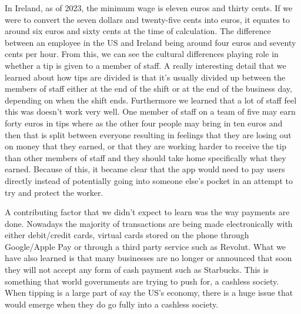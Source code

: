 In Ireland, as of 2023, the minimum wage is eleven euros and thirty cents\cite{MinWageIreland}. If we were to convert the seven dollars and twenty-five cents into euros, it equates to around six euros and sixty cents at the time of calculation. The difference between an employee in the US and Ireland being around four euros and seventy cents per hour. From this, we can see the cultural differences playing role in whether a tip is given to a member of staff. A really interesting detail that we learned about how tips are divided is that it's usually divided up between the members of staff either at the end of the shift or at the end of the business day, depending on when the shift ends. Furthermore we learned that a lot of staff feel this was doesn't work very well. One member of staff on a team of five may earn forty euros in tips where as the other four people may bring in ten euros and then that is split between everyone resulting in feelings that they are losing out on money that they earned, or that they are working harder to receive the tip than other members of staff and they should take home specifically what they earned. Because of this, it became clear that the app would need to pay users directly instead of potentially going into someone else's pocket in an attempt to try and protect the worker.

A contributing factor that we didn't expect to learn was the way payments are done. Nowadays the majority of transactions are being made electronically with either debit/credit cards, virtual cards stored on the phone through Google/Apple Pay or through a third party service such as Revolut. What we have also learned is that many businesses are no longer or announced that soon they will not accept any form of cash payment such as Starbucks. This is something that world governments are trying to push for, a cashless society. When tipping is a large part of say the US's economy, there is a huge issue that would emerge when they do go fully into a cashless society.

